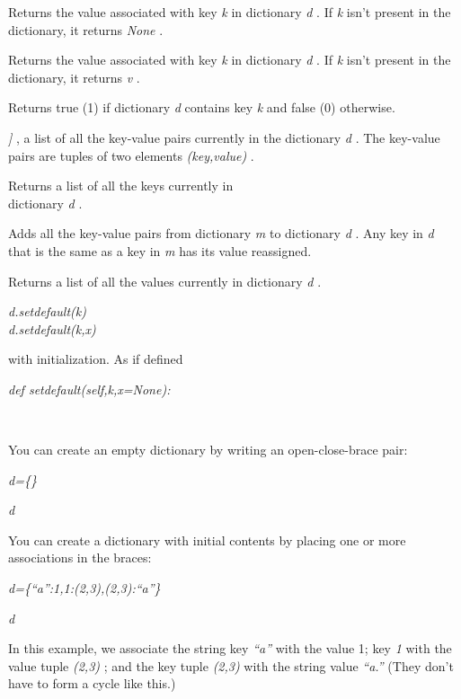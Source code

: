 Returns the value associated with
key \emph{k} in dictionary \emph{d} . If \emph{k} isn't present in the
dictionary, it returns \emph{None} .



Returns the value associated with
key \emph{k} in dictionary \emph{d} . If \emph{k} isn't present in the
dictionary, it returns \emph{v} .



Returns true (1) if dictionary
\emph{d} contains key \emph{k} and false (0) otherwise.




\emph{{]}} , a list of all the key-value pairs currently in the
dictionary \emph{d} . The key-value pairs are tuples of two elements
\emph{(key,value)} .



Returns a list of all the keys
currently in\\
dictionary \emph{d} .



Adds all the key-value pairs from
dictionary \emph{m} to dictionary \emph{d} . Any key in \emph{d} that is
the same as a key in \emph{m} has its value reassigned.



Returns a list of all the values
currently in dictionary \emph{d} .

 \emph{d.setdefault(k)\\
d.setdefault(k,x)}


with initialization. As if defined

 \emph{def
setdefault(self,k,x=None):}











~

You can create an empty dictionary
by writing an open-close-brace pair:


\emph{d=\{\}}


\emph{d}



You can create a dictionary with
initial contents by placing one or more associations in the braces:


\emph{d=\{``a'':1,1:(2,3),(2,3):``a''\}}


\emph{d}



In this example, we associate the
string key \emph{``a''} with the value 1; key \emph{1} with the value
tuple \emph{(2,3)} ; and the key tuple \emph{(2,3)} with the string
value \emph{``a.''} (They don't have to form a cycle like this.)

